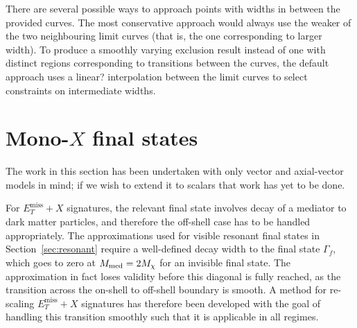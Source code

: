 \documentclass[a4paper, 11pt,notoc]{article}
\newcommand{\MET}{\ensuremath{E_T^\mathrm{miss}}\xspace}
\newcommand{\mDM}{\ensuremath{M_{\chi}}\xspace}
\newcommand{\mMed}{\ensuremath{M_{\rm{med}}}\xspace}
\newcommand{\metplusx}{\ensuremath{\MET+X}\xspace}
\begin{document}
There are several possible ways to approach points with widths in between the provided curves. The most conservative approach would always use the weaker of the two neighbouring limit curves (that is, the one corresponding to larger width). To produce a smoothly varying exclusion result instead of one with distinct regions corresponding to transitions between the curves, the default approach uses a {\color{red} linear?} interpolation between the limit curves to select constraints on intermediate widths.


\section{Mono-$X$ final states}
\label{sec:monox}

{\color{red} The work in this section has been undertaken with only vector and axial-vector models in mind; if we wish to extend it to scalars that work has yet to be done.}

For \metplusx signatures, the relevant final state involves decay of a mediator to dark matter particles, and therefore the off-shell case has to be handled appropriately.
The approximations used for visible resonant final states in Section~\ref{sec:resonant} require a well-defined decay width to the final state $\Gamma_f$, which goes to zero at $\mMed=2\mDM$ for an invisible final state. The approximation in fact loses validity before this diagonal is fully reached, as the transition across the on-shell to off-shell boundary is smooth. A method for re-scaling \metplusx signatures has therefore been developed with the goal of handling this transition smoothly such that it is applicable in all regimes.
\end{document}
